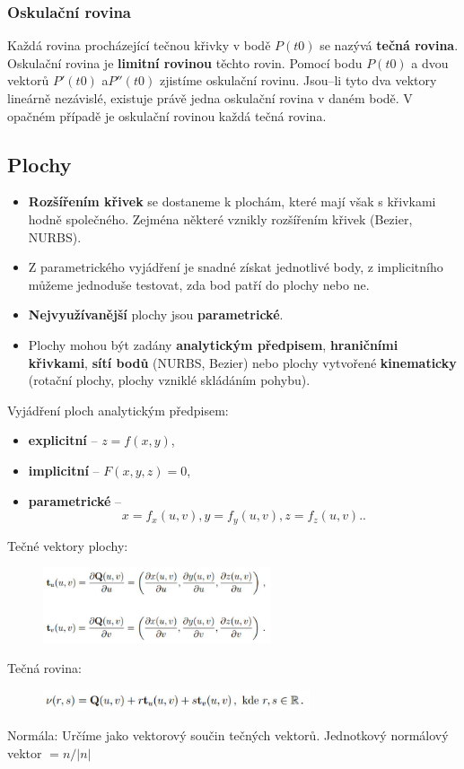 \subsubsection{Oskulační rovina}
Každá rovina procházející tečnou křivky v bodě $P(t0)$ se nazývá \textbf{tečná rovina}. Oskulační rovina je \textbf{limitní rovinou} těchto rovin. Pomocí bodu $P(t0)$ a dvou vektorů $P'(t0)$ a$ P''(t0)$ zjistíme oskulační rovinu. Jsou--li tyto dva vektory lineárně nezávislé, existuje právě jedna oskulační rovina v daném bodě. V opačném případě je oskulační rovinou každá tečná rovina.


\subsection{Plochy}
\begin{itemize}
	\item \textbf{Rozšířením křivek} se dostaneme k plochám, které mají však s křivkami hodně společného. Zejména některé vznikly rozšířením křivek (Bezier, NURBS).
\end{itemize}
\begin{itemize}
	\item Z parametrického vyjádření je snadné získat jednotlivé body, z implicitního můžeme jednoduše testovat, zda bod patří do plochy nebo ne. 
	\item \textbf{Nejvyužívanější} plochy jsou \textbf{parametrické}. 
	\item Plochy mohou být zadány \textbf{analytickým předpisem}, \textbf{hraničními křivkami}, \textbf{sítí bodů} (NURBS, Bezier) nebo plochy vytvořené \textbf{kinematicky} (rotační plochy, plochy vzniklé skládáním pohybu).
\end{itemize}
Vyjádření ploch analytickým předpisem:
\begin{itemize}
	\item \textbf{explicitní} -- $z = f(x, y)$,
	\item \textbf{implicitní} -- $F(x, y, z) = 0$,
	\item \textbf{parametrické} -- 		
	\begin{equation*}
				x = f_x(u, v), y = f_y(u, v), z = f_z(u, v). .
	\end{equation*}
\end{itemize}
Tečné vektory plochy:
\begin{figure}[H]
\centering
\includegraphics[width=0.6\textwidth]{assets/3_tecne_vektory_plochy}
\end{figure}
Tečná rovina:
\begin{figure}[H]
\centering
\includegraphics[width=0.7\textwidth]{assets/3_tecna_rovina}
\end{figure}
Normála: Určíme jako vektorový součin tečných vektorů. Jednotkový normálový vektor  $= n / |n|$

